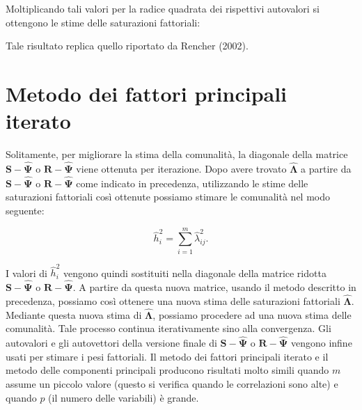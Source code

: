\documentclass[
  11pt,
]{krantz}
\makeatletter
\newenvironment{Shaded}{\begin{snugshade}}{\end{snugshade}}
\newcommand{\CommentTok}[1]{\textcolor[rgb]{0.37,0.37,0.37}{\textit{#1}}}
\newcommand{\DecValTok}[1]{\textcolor[rgb]{0.06,0.06,0.06}{#1}}
\newcommand{\FunctionTok}[1]{\textcolor[rgb]{0,0,0}{#1}}
\newcommand{\NormalTok}[1]{#1}
\newcommand{\SpecialCharTok}[1]{\textcolor[rgb]{0,0,0}{#1}}
\newenvironment{kframe}{%
\medskip{}
\setlength{\fboxsep}{.8em}
 \def\at@end@of@kframe{}%
 \ifinner\ifhmode%
  \def\at@end@of@kframe{\end{minipage}}%
  \begin{minipage}{\columnwidth}%
 \fi\fi%
 \def\FrameCommand##1{\hskip\@totalleftmargin \hskip-\fboxsep
 \colorbox{shadecolor}{##1}\hskip-\fboxsep
     \hskip-\linewidth \hskip-\@totalleftmargin \hskip\columnwidth}%
 \MakeFramed {\advance\hsize-\width
   \@totalleftmargin\z@ \linewidth\hsize
   \@setminipage}}%
 {\par\unskip\endMakeFramed%
 \at@end@of@kframe}
\renewenvironment{Shaded}{\begin{kframe}}{\end{kframe}}
\theoremstyle{definition}
\theoremstyle{definition}
\theoremstyle{definition}
\theoremstyle{definition}
\theoremstyle{remark}
\makeatother
\begin{document}
Moltiplicando tali valori per la radice quadrata dei rispettivi autovalori si ottengono le stime delle saturazioni fattoriali:

\begin{Shaded}
\end{Shaded}

Tale risultato replica quello riportato da Rencher (2002).

\hypertarget{metodo-dei-fattori-principali-iterato}{%
\section{Metodo dei fattori principali iterato}\label{metodo-dei-fattori-principali-iterato}}

Solitamente, per migliorare la stima della comunalità, la diagonale della matrice \(\textbf{S} - \hat{\boldsymbol{\Psi}}\) o \(\textbf{R} - \hat{\boldsymbol{\Psi}}\) viene ottenuta per iterazione. Dopo avere trovato \(\hat{\boldsymbol{\Lambda}}\) a partire da \(\textbf{S} - \hat{\boldsymbol{\Psi}}\) o \(\textbf{R} - \hat{\boldsymbol{\Psi}}\) come indicato in precedenza, utilizzando le stime delle saturazioni fattoriali così ottenute possiamo stimare le comunalità nel modo seguente:

\[\hat{h}^2_i = \sum_{i=1}^m \hat{\lambda}_{ij}^2.\]

I valori di \(\hat{h}^2_i\) vengono quindi sostituiti nella diagonale della matrice ridotta \(\textbf{S} - \hat{\boldsymbol{\Psi}}\) o \(\textbf{R} - \hat{\boldsymbol{\Psi}}\). A partire da questa nuova matrice, usando il metodo descritto in precedenza, possiamo così ottenere una nuova stima delle saturazioni fattoriali \(\hat{\boldsymbol{\Lambda}}\). Mediante questa nuova stima di \(\hat{\boldsymbol{\Lambda}}\), possiamo procedere ad una nuova stima delle comunalità. Tale processo continua iterativamente sino alla convergenza. Gli autovalori e gli autovettori della versione finale di \(\textbf{S} - \hat{\boldsymbol{\Psi}}\) o \(\textbf{R} - \hat{\boldsymbol{\Psi}}\) vengono infine usati per stimare i pesi fattoriali. Il metodo dei fattori principali iterato e il metodo delle componenti principali producono risultati molto simili quando \(m\) assume un piccolo valore (questo si verifica quando le correlazioni sono alte) e quando \(p\) (il numero delle variabili) è grande.
\end{document}
